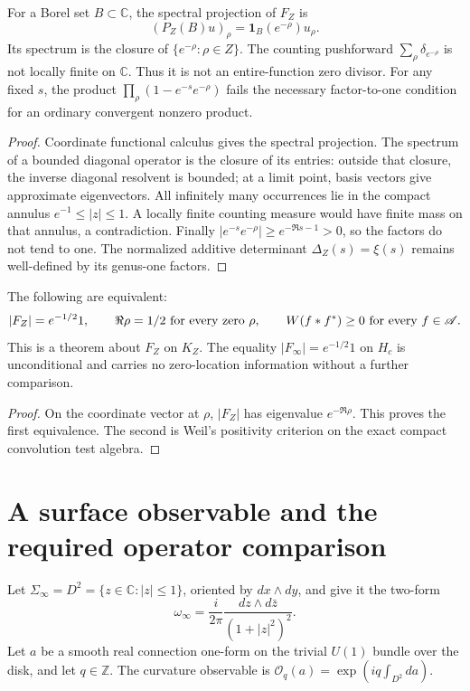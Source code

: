 \begin{proposition}
\label{v4-arith:w9-r2:thm:spectral-identification}
For a Borel set $B\subset\mathbb C$, the spectral projection of
$F_Z$ is
\[
 (P_Z(B)u)_\rho=\mathbf1_B(e^{-\rho})u_\rho.
\]
Its spectrum is the closure of $\{e^{-\rho}:\rho\in Z\}$.
The counting pushforward $\sum_\rho\delta_{e^{-\rho}}$ is not
locally finite on $\mathbb C$. Thus it is not an entire-function
zero divisor.
For any fixed $s$, the product
$\prod_\rho(1-e^{-s}e^{-\rho})$ fails the necessary factor-to-one
condition for an ordinary convergent nonzero product.
\end{proposition}
\begin{proof}
Coordinate functional calculus gives the spectral projection.
The spectrum of a bounded diagonal operator is the closure of its
entries: outside that closure, the inverse diagonal resolvent is
bounded; at a limit point, basis vectors give approximate eigenvectors.
All infinitely many occurrences lie in the compact annulus
$e^{-1}\le|z|\le1$. A locally finite counting measure would have
finite mass on that annulus, a contradiction.
Finally $|e^{-s}e^{-\rho}|\ge e^{-\Re s-1}>0$, so the factors do
not tend to one. The normalized additive determinant
$\Delta_Z(s)=\xi(s)$ remains well-defined by its genus-one factors.
\end{proof}

\begin{theorem}
\label{v4-arith:w9-r2:thm:purity-ATP-RH}
The following are equivalent:
\[
 |F_Z|=e^{-1/2}1,
 \qquad \Re\rho=1/2\ \hbox{for every zero }\rho,
 \qquad W(f*f^*)\ge0\ \hbox{for every }f\in\mathscr A.
\]
This is a theorem about $F_Z$ on $K_Z$.
The equality $|F_\infty|=e^{-1/2}1$ on $H_c$ is unconditional and
carries no zero-location information without a further comparison.
\end{theorem}
\begin{proof}
On the coordinate vector at $\rho$, $|F_Z|$ has eigenvalue
$e^{-\Re\rho}$. This proves the first equivalence.
The second is Weil's positivity criterion on the exact compact
convolution test algebra.
\end{proof}

\section{A surface observable and the required operator comparison}
\begin{definition}
\label{v4-arith:w9-r2:def:Sigma-infty}
Let $\Sigma_\infty=D^2=\{z\in\mathbb C:|z|\le1\}$, oriented by
$dx\wedge dy$, and give it the two-form
\[
 \omega_\infty=\frac{i}{2\pi}
              \frac{dz\wedge d\bar z}{(1+|z|^2)^2}.
\]
Let $a$ be a smooth real connection one-form on the trivial $U(1)$
bundle over the disk, and let $q\in\mathbb Z$.
The curvature observable is
$\mathcal O_q(a)=\exp(iq\int_{D^2}da)$.
\end{definition}

